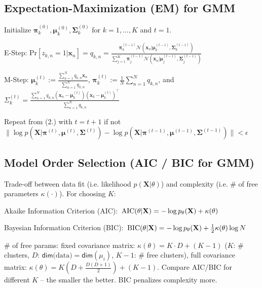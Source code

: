 \documentclass[a4paper, 11pt, landscape]{article}
\begin{document}
\begin{multicols*}{3}
\subsection{Expectation-Maximization (EM) for GMM}
\begin{compactenum}
	\item Initialize $\boldsymbol{\pi}_k^{(0)}, \boldsymbol{\mu}_k^{(0)}, \boldsymbol{\Sigma}_k^{(0)}$ for $k = 1, \ldots, K$ and $t=1$.
	\item E-Step: Pr$[z_{k,n} = 1 | \mathbf{x}_n] = q_{k, n} = \frac{\boldsymbol{\pi}_k^{(t-1)} \mathcal{N}(\mathbf{x}_n | \boldsymbol{\mu}_k^{(t-1)}, \boldsymbol{\Sigma}_k^{(t-1)})}{\sum_{j=1}^K \boldsymbol{\pi}_j^{(t-1)} \mathcal{N}(\mathbf{x}_n | \boldsymbol{\mu}_j^{(t-1)}, \boldsymbol{\Sigma}_j^{(t-1)})}$
	\item M-Step: $\boldsymbol{\mu}_k^{(t)} := \frac{\sum_{n=1}^N q_{k,n} \mathbf{x}_n}{\sum_{n=1}^N q_{k,n}}$, $\boldsymbol{\pi}_k^{(t)} := \frac{1}{N} \sum_{n=1}^N q_{k,n}$, and $\Sigma_k^{(t)} = \frac{\sum_{n=1}^N q_{k, n} (\mathbf{x}_n - \boldsymbol{\mu}_k^{(t)})(\mathbf{x}_k - \boldsymbol{\mu}_k^{(t)})^\top}{\sum_{n=1}^N q_{k,n}}$
	\item Repeat from (2.) with $t = t + 1$ if not $\| \log p(\mathbf{X} | \boldsymbol{\pi}^{(t)}, \boldsymbol{\mu}^{(t)}, \boldsymbol{\Sigma}^{(t)}) - \log p(\mathbf{X} | \boldsymbol{\pi}^{(t-1)}, \boldsymbol{\mu}^{(t-1)}, \boldsymbol{\Sigma}^{(t-1)}) \| < \epsilon$
\end{compactenum}

\subsection{Model Order Selection (AIC / BIC for GMM)}
Trade-off between data fit (i.e. likelihood $p(\mathbf{X} | \theta)$) and complexity (i.e. \# of free parameters $\kappa(\cdot)$). For choosing $K$:
\begin{compactdesc}
	\item[Akaike Information Criterion (AIC):] $\\\operatorname{AIC}(\theta | \mathbf{X}) = -\log p_\theta(\mathbf{X}) + \kappa(\theta)$
	\item[Bayesian Information Criterion (BIC):] $\\\operatorname{BIC}(\theta | \mathbf{X}) = -\log p_\theta(\mathbf{X}) + \frac{1}{2} \kappa(\theta) \log N$
	\item[\# of free params:] fixed covariance matrix: $\kappa(\theta) = K \cdot D + (K - 1)$ ($K$: \# clusters, $D$: $\mathsf{dim}\text{(data)}=\mathsf{dim}(\mu_i)$, $K-1$: \# free clusters), full covariance matrix: $\kappa(\theta) = K(D + \frac{D(D+1)}{2}) + (K - 1)$. Compare AIC/BIC for different $K$ -- the smaller the better. BIC penalizes complexity more.
\end{compactdesc}


\end{multicols*}
\end{document}
